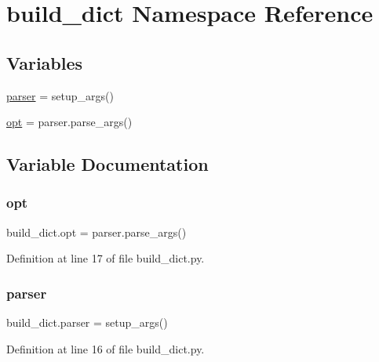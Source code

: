 \hypertarget{namespacebuild__dict}{}\section{build\+\_\+dict Namespace Reference}
\label{namespacebuild__dict}
\subsection*{Variables}
\begin{DoxyCompactItemize}
\item 
\hyperlink{namespacebuild__dict_a5f94323cf271c63a1edd5019b4c9822a}{parser} = setup\+\_\+args()
\item 
\hyperlink{namespacebuild__dict_a32b0ccaefff33eb8d69548e17882318f}{opt} = parser.\+parse\+\_\+args()
\end{DoxyCompactItemize}


\subsection{Variable Documentation}
\mbox{\label{namespacebuild__dict_a32b0ccaefff33eb8d69548e17882318f}} 
\subsubsection{\texorpdfstring{opt}{opt}}
{\footnotesize\ttfamily build\+\_\+dict.\+opt = parser.\+parse\+\_\+args()}



Definition at line 17 of file build\+\_\+dict.\+py.

\mbox{\label{namespacebuild__dict_a5f94323cf271c63a1edd5019b4c9822a}} 
\subsubsection{\texorpdfstring{parser}{parser}}
{\footnotesize\ttfamily build\+\_\+dict.\+parser = setup\+\_\+args()}



Definition at line 16 of file build\+\_\+dict.\+py.

